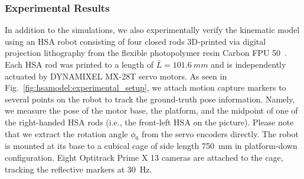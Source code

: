     

\subsubsection{Experimental Results}\label{ssub:hsamodel:hsa_rod_kinematics:experimental_results}
In addition to the simulations, we also experimentally verify the kinematic model using an \gls{HSA} robot consisting of four closed rods 3D-printed via digital projection lithography from the flexible photopolymer resin Carbon FPU 50~\citep{truby2021recipe}. Each \gls{HSA} rod was printed to a length of $\bar{L} = \SI{101.6}{mm}$ and is independently actuated by DYNAMIXEL MX-28T servo motors.
As seen in Fig.~\ref{fig:hsamodel:experimental_setup}, we attach motion capture markers to several points on the robot to track the ground-truth pose information. Namely, we measure the pose of the motor base, the platform, and the midpoint of one of the right-handed \gls{HSA} rods (i.e., the front-left \gls{HSA} on the picture). Please note that we extract the rotation angle $\phi_0$ from the servo encoders directly. The robot is mounted at its base to a cubical cage of side length \SI{750}{mm} in platform-down configuration. Eight Optitrack Prime X 13 cameras are attached to the cage, tracking the reflective markers at \SI{30}{Hz}.

